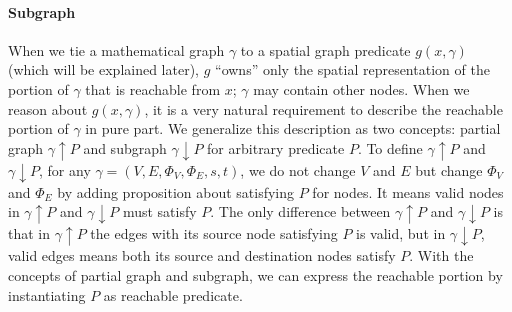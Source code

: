 \paragraph{Subgraph}
When we tie a mathematical graph $\gamma$ to a spatial graph predicate
$g(x, \gamma)$ (which will be explained later), $g$ ``owns'' only the
spatial representation of the portion of $\gamma$ that is reachable
from $x$; $\gamma$ may contain other nodes. When we reason about
$g(x, \gamma)$, it is a very natural requirement to describe the
reachable portion of $\gamma$ in pure part. We generalize this
description as two concepts: partial graph $\gamma \!\uparrow\! P$ and
subgraph $\gamma \!\downarrow\! P$ for arbitrary predicate $P$. To define
$\gamma \!\uparrow\! P$ and $\gamma \!\downarrow\! P$, for any $\gamma=(V,
E, \Phi_V, \Phi_E, s, t)$, we do not change $V$ and $E$ but change
$\Phi_V$ and $\Phi_E$ by adding proposition about satisfying $P$ for
nodes. It means valid nodes in $\gamma \!\uparrow\! P$ and
$\gamma \!\downarrow\! P$ must satisfy $P$. The only difference between
$\gamma \!\uparrow\! P$ and $\gamma \!\downarrow\! P$ is that in
$\gamma \!\uparrow\! P$ the edges with its source node satisfying $P$ is
valid, but in $\gamma \!\downarrow\! P$, valid edges means both its source
and destination nodes satisfy $P$. With the concepts of partial graph
and subgraph, we can express the reachable portion by instantiating
$P$ as reachable predicate.


